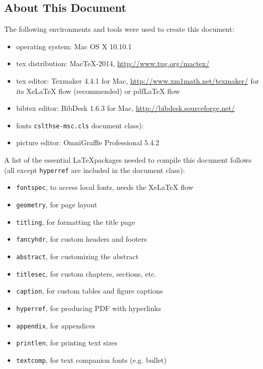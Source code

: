 \documentclass{cslthse-msc}
\begin{document}
\begin{appendices}
\chapter{About This Document}
The following environments and tools were used to create this document:
\begin{itemize}
\item operating system: Mac OS X 10.10.1
\item tex distribution: MacTeX-2014, \url{http://www.tug.org/mactex/}
\item tex editor: Texmaker 4.4.1 for Mac, \url{http://www.xm1math.net/texmaker/} for its XeLaTeX flow (recommended) or pdfLaTeX flow
\item bibtex editor: BibDesk 1.6.3 for Mac, \url{http://bibdesk.sourceforge.net/}
\item fonts \texttt{cslthse-msc.cls} document class): 
\item picture editor: OmniGraffle Professional 5.4.2
\end{itemize}

\noindent A list of the essential \LaTeX packages needed to compile this document follows (all except \texttt{hyperref} are included in the document class):
\begin{itemize}
\item \texttt{fontspec}, to access local fonts, needs the XeLaTeX flow
\item \texttt{geometry}, for page layout
\item \texttt{titling}, for formatting the title page
\item \texttt{fancyhdr}, for custom headers and footers
\item \texttt{abstract}, for customizing the abstract
\item \texttt{titlesec}, for custom chapters, sections, etc.
\item \texttt{caption}, for custom tables and figure captions
\item \texttt{hyperref}, for producing PDF with hyperlinks
\item \texttt{appendix}, for appendices
\item \texttt{printlen}, for printing text sizes
\item \texttt{textcomp}, for text companion fonts (e.g. bullet)
\end{itemize}


\end{appendices}
\end{document}
